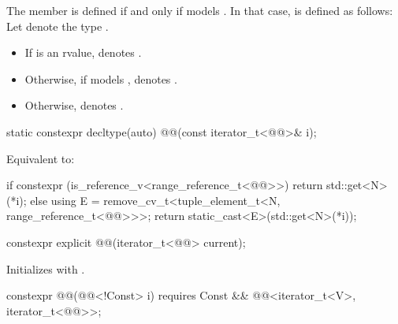 \pnum
The member   is defined
if and only if  models .
In that case,  is defined as follows:
Let  denote the type
.
\begin{itemize}
\item
If  is an rvalue,
 denotes .
\item
Otherwise, if  models ,
 denotes .
\item
Otherwise,  denotes .
\end{itemize}

%
\begin{itemdecl}
static constexpr decltype(auto) @@(const iterator_t<@@>& i);
\end{itemdecl}

\begin{itemdescr}
\pnum
\effects
Equivalent to:
\begin{codeblock}
if constexpr (is_reference_v<range_reference_t<@@>>) {
  return std::get<N>(*i);
} else {
  using E = remove_cv_t<tuple_element_t<N, range_reference_t<@@>>>;
  return static_cast<E>(std::get<N>(*i));
}
\end{codeblock}
\end{itemdescr}

%
\begin{itemdecl}
constexpr explicit @@(iterator_t<@@> current);
\end{itemdecl}

\begin{itemdescr}
\pnum
\effects
Initializes  with .
\end{itemdescr}

%
\begin{itemdecl}
constexpr @@(@@<!Const> i)
  requires Const && @@<iterator_t<V>, iterator_t<@@>>;
\end{itemdecl}

